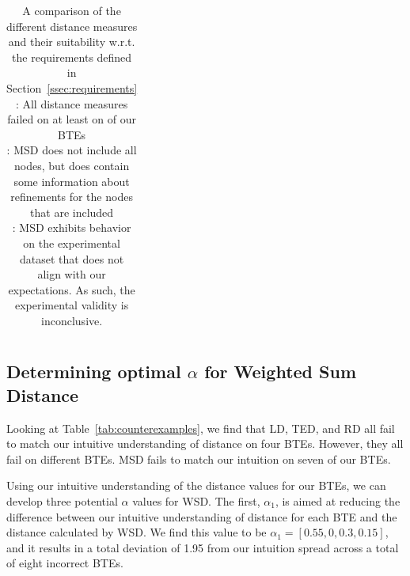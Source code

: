 \begin{table}[ht!]
{\begin{tabular}{@{}lcccc:ccc:cc@{}}
        \end{tabular}
    }
    \caption{A comparison of the different distance measures and their suitability w.r.t. the requirements defined in Section~\ref{ssec:requirements}\\
        \footnotesize
        \ReqFootOne: All distance measures failed on at least on of our BTEs\\
        \ReqFootTwo: MSD does not include all nodes, but does contain some information about refinements for the nodes that are included\\
        \ReqFootThree: MSD exhibits behavior on the experimental dataset that does not align with our expectations. As such, the experimental validity is inconclusive.
        \normalsize}
    \label{tab:requirmeent-suitability}
\end{table}


\subsection{Determining optimal $\alpha$ for Weighted Sum Distance}
\label{ssec:results-alpha}


Looking at Table~\ref{tab:counterexamples}, we find that LD, TED, and RD all fail to match our intuitive understanding of distance on four BTEs. However, they all fail on different BTEs. MSD fails to match our intuition on seven of our BTEs.

Using our intuitive understanding of the distance values for our BTEs, we can develop three potential $\alpha$ values for WSD. The first, $\alpha_1$, is aimed at reducing the difference between our intuitive understanding of distance for each BTE and the distance calculated by WSD. We find this value to be $\alpha_1=[0.55, 0, 0.3, 0.15]$, and it results in a total deviation of 1.95 from our intuition spread across a total of eight incorrect BTEs.

